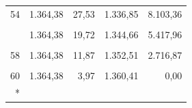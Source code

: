 \begin{longtable}[t]{rrrrr}
54 & 1.364,38 & 27,53 & 1.336,85 & 8.103,36\\
\cellcolor{gray!10}{55} & \cellcolor{gray!10}{1.364,38} & \cellcolor{gray!10}{23,63} & \cellcolor{gray!10}{1.340,75} & \cellcolor{gray!10}{6.762,62}\\
\addlinespace
56 & 1.364,38 & 19,72 & 1.344,66 & 5.417,96\\
\cellcolor{gray!10}{57} & \cellcolor{gray!10}{1.364,38} & \cellcolor{gray!10}{15,80} & \cellcolor{gray!10}{1.348,58} & \cellcolor{gray!10}{4.069,38}\\
58 & 1.364,38 & 11,87 & 1.352,51 & 2.716,87\\
\cellcolor{gray!10}{59} & \cellcolor{gray!10}{1.364,38} & \cellcolor{gray!10}{7,92} & \cellcolor{gray!10}{1.356,46} & \cellcolor{gray!10}{1.360,41}\\
60 & 1.364,38 & 3,97 & 1.360,41 & 0,00\\*
\end{longtable}